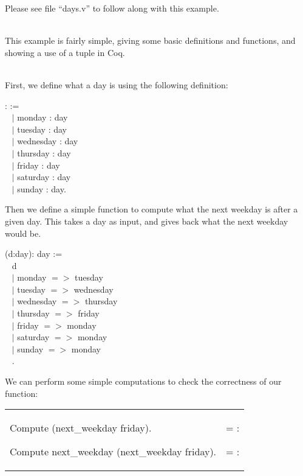 
Please see file ``days.v'' to follow along with this example. 

~\\
This example is fairly simple, giving some basic definitions and functions, and showing a use of a tuple in Coq.  

~\\
\noindent
First, we define what a day is using the following definition:

\begin{code}
\Inductive {}: \Type :=		\\ \-\ \quad
  $\mid$ monday : day			\\ \-\ \quad
  $\mid$ tuesday : day			\\ \-\ \quad
  $\mid$ wednesday : day			\\ \-\ \quad
  $\mid$ thursday : day			\\ \-\ \quad
  $\mid$ friday : day				\\ \-\ \quad
  $\mid$ saturday : day			\\ \-\ \quad
  $\mid$ sunday : day.
\end{code}

\noindent
Then we define a simple function to compute what the next weekday is after a given day. 
This takes a day as input, and gives back what the next weekday would be.

\begin{code}
\Definition {} (d:day): day :=		\\ \-\ \quad
  \match d \with								\\ \-\ \qquad
   $\mid$ monday $=>$ tuesday					\\ \-\ \qquad
   $\mid$ tuesday $=>$ wednesday				\\ \-\ \qquad
   $\mid$ wednesday $=>$ thursday				\\ \-\ \qquad
   $\mid$ thursday $=>$ friday					\\ \-\ \qquad
   $\mid$ friday $=>$ monday					\\ \-\ \qquad
   $\mid$ saturday $=>$ monday				\\ \-\ \qquad
   $\mid$ sunday $=>$ monday					\\ \-\ \quad
  \End.
\end{code}

\noindent
We can perform some simple computations to check the correctness of our function:

\hspace{-1cm}
\begin{tabular}{p{9cm} p{7cm}}
\begin{code} 	Compute (next\_weekday friday).	\end{code}
\begin{code}	Compute next\_weekday (next\_weekday friday).	\end{code}	
&	
\begin{msg}	     = \nm{monday}     : \nm{day}	\end{msg}
\begin{msg}	     = \nm{tuesday}     : \nm{day}		\end{msg}
\end{tabular}

